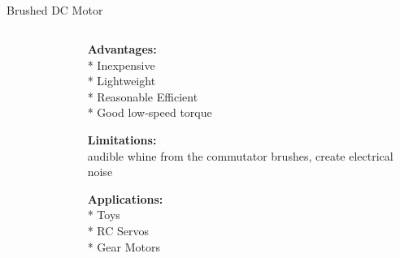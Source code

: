 \subsection{}
{
\begin{frame}{Brushed DC Motor}

\begin{columns}
\begin{column}{0.4\textwidth}  %

	\vspace{-3mm}
   	\begin{figure}
 	\end{figure}

\end{column}

\begin{column}{0.6\textwidth}

{\bf Advantages:} \\
* Inexpensive \\
* Lightweight \\
* Reasonable Efficient \\
* Good low-speed torque

{\bf Limitations:} \\
audible whine from the commutator brushes,
create electrical noise

{\bf Applications:} \\
* Toys \\
* RC Servos \\
* Gear Motors

\end{column}

\end{columns}

\end{frame}
}




